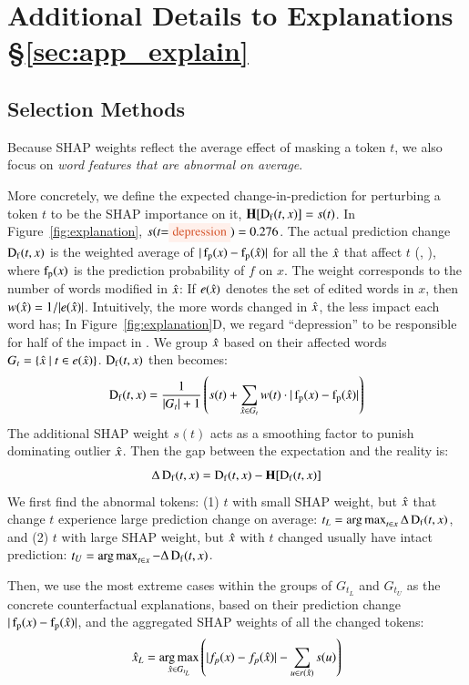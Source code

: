 \section{Additional Details to Explanations \S\ref{sec:app_explain}}
\label{appendix:explanation}


\subsection{Selection Methods}
\label{appendix:exp_rank}

Because  SHAP weights reflect the average effect of masking a token $t$, we also focus on \emph{word features that are abnormal on average}.

More concretely, we define the expected change-in-prediction for perturbing a token $t$ to be the SHAP importance on it, $\operatorname*{\mathbf{H}}[\operatorname*{D_f}(t, x)] = s(t)$.
In Figure~\ref{fig:explanation}, $s(t\text{=\remove{depression}})=0.276$.
The actual prediction change $\operatorname*{D_f}(t, x)$ is the weighted average of $|\operatorname*{f_p}(x)-\operatorname*{f_p}(\hat{x})|$ for all the $\hat{x}$ that affect $t$ (, ), where $\operatorname*{f_p}(x)$ is the prediction probability of $f$ on $x$.
The weight corresponds to the number of words modified in $\hat{x}$: If $e(\hat{x})$ denotes the set of edited words in $x$, then $w(\hat{x}) = 1/|e(\hat{x})|$.
Intuitively, the more words changed in $\hat{x}$, the less impact each word has; In Figure~\ref{fig:explanation}D, we regard ``depression'' to be responsible for half of the impact in .
We group $\hat{x}$ based on their affected words $G_t = \{\hat{x}\ |\ t \in e(\hat{x})\}$. $\operatorname*{D_f}(t, x)$ then becomes:
$$\operatorname*{D_f}(t, x) = \frac{1}{|G_t|+1} \left(s(t) + \sum_{\hat{x} \in G_t} w(t)\cdot |\operatorname*{f_p}(x)-\operatorname*{f_p}(\hat{x})|\right)$$
The additional SHAP weight $s(t)$ acts as a smoothing factor to punish dominating outlier $\hat{x}$.
Then the gap between the expectation and the reality is:
$$\Delta\operatorname*{D_f}(t, x) = \operatorname*{D_f}(t, x)-\operatorname*{\mathbf{H}}[\operatorname*{D_f}(t, x)]$$
We first find the abnormal tokens: (1) $t$ with small SHAP weight, but $\hat{x}$ that change $t$ experience large prediction change on average: $t_L = \operatorname*{arg\,max}_{t\in x} \Delta\operatorname*{D_f}(t, x)$, and (2) $t$ with large SHAP weight, but $\hat{x}$ with $t$ changed usually have intact prediction: $t_U = \operatorname*{arg\,max}_{t\in x} -\Delta\operatorname*{D_f}(t, x)$.

Then, we use the most extreme cases within the groups of $G_{t_L}$ and $G_{t_U}$ as the concrete counterfactual explanations, based on their prediction change $|\operatorname*{f_p}(x)-\operatorname*{f_p}(\hat{x})|$, and the aggregated SHAP weights of all the changed tokens:
$$\hat{x}_L = \operatorname*{arg\,max}_{\hat{x} \in G_{t_L}} \left( |f_p(x)-f_p(\hat{x})| - \sum_{u\in r(\hat{x})} s(u) \right)$$ 


